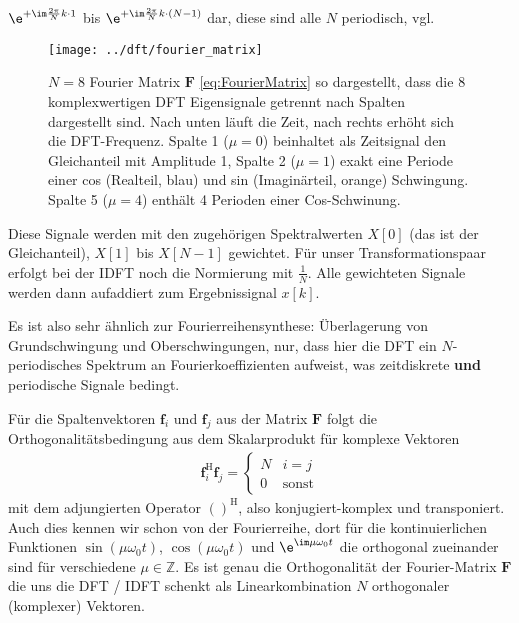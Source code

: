 $\e^{+\im\frac{2\pi}{N}k \cdot 1}$ bis $\e^{+\im\frac{2\pi}{N}k \cdot (N-1)}$
dar, diese sind alle $N$ periodisch, vgl.~
%
\begin{figure}
\centering
\texttt{[image: ../dft/fourier\_matrix]}
\caption{$N=8$ Fourier Matrix $\bm{F}$ \eqref{eq:FourierMatrix} so dargestellt, dass
die 8 komplexwertigen DFT Eigensignale getrennt nach Spalten dargestellt sind.
Nach unten läuft die Zeit, nach rechts erhöht sich die DFT-Frequenz.
Spalte 1 ($\mu=0$) beinhaltet als Zeitsignal den Gleichanteil mit Amplitude 1,
Spalte 2 ($\mu=1$) exakt eine Periode einer cos (Realteil, blau) und sin (Imaginärteil, orange)
Schwingung. Spalte 5 ($\mu=4$) enthält 4 Perioden einer Cos-Schwinung.}
\label{fig:fourier_matrix}
\end{figure}


Diese Signale werden mit den zugehörigen Spektralwerten
$X[0]$ (das ist der Gleichanteil), $X[1]$ bis $X[N-1]$ gewichtet.
Für unser Transformationspaar erfolgt bei der IDFT noch die Normierung mit
$\frac{1}{N}$. Alle gewichteten Signale werden dann aufaddiert zum Ergebnissignal
$x[k]$.

Es ist also sehr ähnlich zur Fourierreihensynthese: Überlagerung von
Grundschwingung und Oberschwingungen, nur, dass hier die DFT ein $N$-periodisches
Spektrum an Fourierkoeffizienten aufweist, was zeitdiskrete \textbf{und}
periodische Signale bedingt.
%

Für die Spaltenvektoren $\bm{f}_i$ und $\bm{f}_j$ aus der Matrix $\bm{F}$
folgt die Orthogonalitätsbedingung aus dem Skalarprodukt für komplexe Vektoren
\begin{align}
\bm{f}_i^\mathrm{H} \bm{f}_j =
\begin{cases}
N & i=j\\
0 & \text{sonst}
\end{cases}
\end{align}
mit dem adjungierten Operator $()^\mathrm{H}$, also konjugiert-komplex und transponiert.
Auch dies kennen wir schon von der Fourierreihe, dort für die kontinuierlichen
Funktionen
$\sin(\mu \omega_0 t)$, $\cos(\mu \omega_0 t)$ und $\e^{\im \mu \omega_0 t}$ die
orthogonal zueinander sind für verschiedene $\mu\in\mathbb{Z}$.
%
Es ist genau die Orthogonalität der Fourier-Matrix $\bm{F}$ die uns die DFT / IDFT
schenkt als Linearkombination $N$ orthogonaler (komplexer) Vektoren.
%

